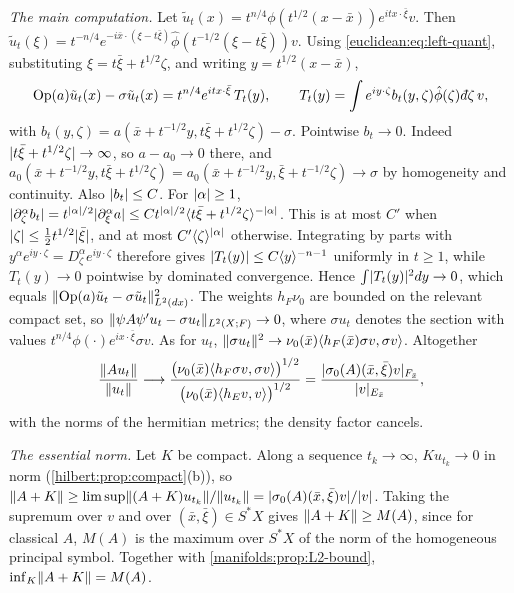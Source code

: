 \emph{The main computation.} Let $\tilde u_t(x)=t^{n/4}\phi(t^{1/2}(x-\bar x))e^{itx\cdot\bar\xi}v$. Then
$\hat{\tilde u}_t(\xi)=t^{-n/4}e^{-i\bar x\cdot(\xi-t\bar\xi)}\hat\phi(t^{-1/2}(\xi-t\bar\xi))v$. Using
\eqref{euclidean:eq:left-quant}, substituting $\xi=t\bar\xi+t^{1/2}\zeta$, and writing
$y=t^{1/2}(x-\bar x)$,
\begin{equation*}
\Op(a)\tilde u_t(x)-\sigma\tilde u_t(x)=t^{n/4}e^{itx\cdot\bar\xi}\,T_t(y),\qquad
T_t(y)=\int e^{iy\cdot\zeta}b_t(y,\zeta)\hat\phi(\zeta)\,\dbar\zeta\,v,
\end{equation*}
with $b_t(y,\zeta)=a(\bar x+t^{-1/2}y,t\bar\xi+t^{1/2}\zeta)-\sigma$. Pointwise $b_t\to0$. Indeed
$\lvert t\bar\xi+t^{1/2}\zeta\rvert\to\infty$, so $a-a_0\to0$ there, and
$a_0(\bar x+t^{-1/2}y,t\bar\xi+t^{1/2}\zeta)=a_0(\bar x+t^{-1/2}y,\bar\xi+t^{-1/2}\zeta)\to\sigma$ by homogeneity
and continuity. Also $\lvert b_t\rvert\le C$. For $\lvert \alpha\rvert\ge1$,
$\lvert \partial^\alpha_\zeta b_t\rvert=t^{\lvert \alpha\rvert/2}\lvert \partial^\alpha_\xi a\rvert\le Ct^{\lvert \alpha\rvert/2}\langle t\bar\xi+t^{1/2}\zeta\rangle^{-\lvert \alpha\rvert}$. This is
at most $C'$ when $\lvert \zeta\rvert\le\frac12t^{1/2}\lvert \bar\xi\rvert$, and at most $C'\langle \zeta\rangle^{\lvert \alpha\rvert}$ otherwise.
Integrating by parts with $y^\alpha e^{iy\cdot\zeta}=D^\alpha_\zeta e^{iy\cdot\zeta}$ therefore gives
$\lvert T_t(y)\rvert\le C\langle y\rangle^{-n-1}$ uniformly in $t\ge1$, while $T_t(y)\to0$ pointwise by dominated
convergence. Hence $\int\lvert T_t(y)\rvert^2dy\to0$, which equals
$\lVert \operatorname{Op}(a)\tilde u_t-\sigma\tilde u_t\rVert^2_{L^2(dx)}$. The weights $h_F\nu_0$ are bounded on the
relevant compact set, so $\lVert \psi A\psi'u_t-\sigma u_t\rVert_{L^2(X;F)}\to0$, where $\sigma u_t$ denotes the
section with values $t^{n/4}\phi(\cdot)e^{ix\cdot\bar\xi}\sigma v$. As for $u_t$,
$\lVert \sigma u_t\rVert^2\to\nu_0(\bar x)\langle h_F(\bar x)\sigma v,\sigma v\rangle$. Altogether
\begin{equation*}
\frac{\lVert Au_t\rVert}{\lVert u_t\rVert}\longrightarrow\frac{\big(\nu_0(\bar x)\langle h_F\sigma v,\sigma v\rangle\big)^{1/2}}
{\big(\nu_0(\bar x)\langle h_Ev,v\rangle\big)^{1/2}}=\frac{\lvert \sigma_0(A)(\bar x,\bar\xi)v\rvert_{F_{\bar x}}}{\lvert v\rvert_{E_{\bar x}}},
\end{equation*}
with the norms of the hermitian metrics; the density factor cancels.

\emph{The essential norm.} Let $K$ be compact. Along a sequence $t_k\to\infty$, $Ku_{t_k}\to0$ in norm
(\cref{hilbert:prop:compact}(b)), so
$\lVert A+K\rVert\ge\limsup\lVert (A+K)u_{t_k}\rVert/\lVert u_{t_k}\rVert=\lvert \sigma_0(A)(\bar x,\bar\xi)v\rvert/\lvert v\rvert$. Taking
the supremum over $v$ and over $(\bar x,\bar\xi)\in S^*X$ gives $\lVert A+K\rVert\ge M(A)$, since for classical
$A$, $M(A)$ is the maximum over $S^*X$ of the norm of the homogeneous principal symbol.
Together with \cref{manifolds:prop:L2-bound},
$\inf_K\lVert A+K\rVert=M(A)$.

